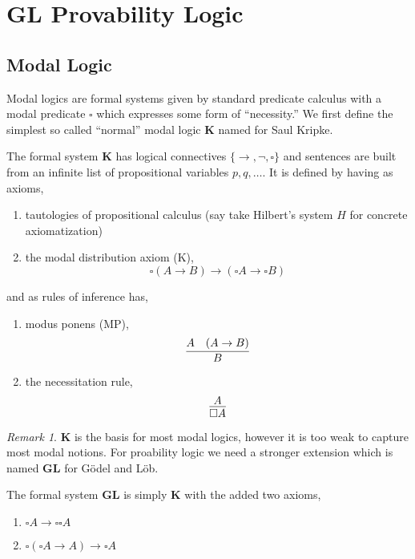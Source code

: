 \documentclass[12pt, leqno]{article}
\newenvironment{definition}[1][Definition:]{\begin{trivlist}
\item[\hskip \labelsep {\bfseries #1}]}{\end{trivlist}}
\theoremstyle{theorem}
\theoremstyle{definition}
\theoremstyle{definition}
\theoremstyle{remark}
\theoremstyle{definition}
\theoremstyle{remark}
\newtheorem{remark}{Remark}[subsection]
\begin{document}
\section{GL Provability Logic}

\newcommand{\K}{\mathbf{K}}
\newcommand{\GL}{\mathbf{GL}}
\newcommand{\PA}{\mathbf{PA}}

\subsection{Modal Logic}

Modal logics are formal systems given by standard predicate calculus with a modal predicate $\square$ which expresses some form of ``necessity.'' We first define the simplest so called ``normal'' modal logic $\K$ named for Saul Kripke.

\begin{definition}
The formal system $\K$ has logical connectives $\{ \to, \neg, \square \}$ and sentences are built from an infinite list of propositional variables $p, q, \dots$. It is defined by having as axioms,
\begin{enumerate}
\item tautologies of propositional calculus (say take Hilbert's system $H$ for concrete axiomatization) 
\item the modal distribution axiom (K),
\[ \square (A \to B) \to (\square A \to \square B) \]
\end{enumerate}
and as rules of inference has,
\begin{enumerate}
\item modus ponens (MP),
\[ \infer{B}{A & (A \rightarrow B)} \]
\item the necessitation rule,
\[ \infer{\square A}{A} \]
\end{enumerate}
\end{definition}

\begin{remark}
$\K$ is the basis for most modal logics, however it is too weak to capture most modal notions. For proability logic we need a stronger extension which is named $\GL$ for G\"{o}del and L\"{o}b.
\end{remark}

\begin{definition}
The formal system $\GL$ is simply $\K$ with the added two axioms,
\begin{enumerate}
\item[(4)] $\square A \to \square \square A$
\item[(L)] $\square (\square A \to A) \to \square A$  
\end{enumerate}
\end{definition}
\end{document}
